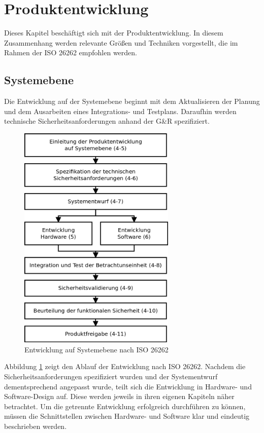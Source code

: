 \documentclass[a4paper,DIV=calc,ngerman]{scrartcl}
\begin{document}
\section{Produktentwicklung}
\label{sec:Produktentwicklung}
Dieses Kapitel beschäftigt sich mit der Produktentwicklung. In diesem Zusammenhang werden relevante Größen und Techniken vorgestellt, die im Rahmen der ISO 26262 empfohlen werden. 



\subsection{Systemebene}
\label{sec:Systemebene}
Die Entwicklung auf der Systemebene beginnt mit dem Aktualisieren der Planung und dem Ausarbeiten eines Integrations- und Testplans. Daraufhin werden technische Sicherheitsanforderungen anhand der G\&R spezifiziert.

\begin{figure}
\includegraphics[width=7.5cm]{Abb_6_3}
\caption{Entwicklung auf Systemebene nach ISO 26262\cite{1}}
\label{fig:system}
\end{figure}

Abbildung \ref{fig:system} zeigt den Ablauf der Entwicklung nach ISO 26262. Nachdem die Sicherheitsanforderungen spezifiziert wurden und der Systementwurf dementsprechend angepasst wurde, teilt sich die Entwicklung in Hardware- und Software-Design auf. Diese werden jeweils in ihren eigenen Kapiteln näher betrachtet. Um die getrennte Entwicklung erfolgreich durchführen zu können, müssen die Schnittstellen zwischen Hardware- und Software klar und eindeutig beschrieben werden.
\end{document}
